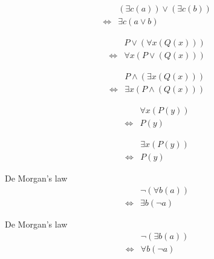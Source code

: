 \begin{prop}
\label{Proposition:exists_lor_commutativity}
\begin{align*}
& (\exists c (a)) \lor (\exists c (b)) \\
\iff & \exists c (a \lor b)
\end{align*}
\end{prop}

\begin{prop}
\label{Proposition:lor_forall_distributivity}
\begin{align*}
& P \lor (\forall x (Q(x))) \\
\iff & \forall x (P \lor (Q(x)))
\end{align*}
\end{prop}

\begin{prop}
\label{Proposition:land_exists_distributivity}
\begin{align*}
& P \land (\exists x (Q(x))) \\
\iff & \exists x (P \land (Q(x)))
\end{align*}
\end{prop}

\begin{axm}
\label{Axiom:forall_independent_variable}
\begin{align*}
& \forall x (P(y)) \\
\iff & P(y)
\end{align*}
\end{axm}

\begin{axm}
\label{Axiom:exists_independent_variable}
\begin{align*}
& \exists x (P(y)) \\
\iff & P(y)
\end{align*}
\end{axm}

\begin{prop}
\label{Proposition:De_Morgan_1}
De Morgan's law
\begin{align*}
& \lnot (\forall b (a)) \\
\iff & \exists b (\lnot a)
\end{align*}
\end{prop}

\begin{prop}
\label{Proposition:De_Morgan_2}
De Morgan's law
\begin{align*}
& \lnot (\exists b (a)) \\
\iff & \forall b (\lnot a)
\end{align*}
\end{prop}

